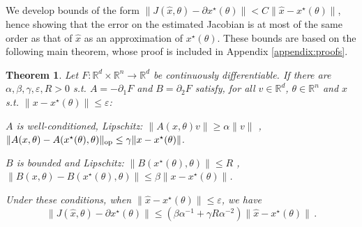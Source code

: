 \documentclass{article}
\makeatletter
\def\RR{{\mathbb R}}
\newtheorem{theorem}{Theorem}
\newcommand{\qberthet}[1]{\textcolor{red}{\texttt{qberthet@:} #1}}
\makeatother
\begin{document}
We develop bounds of the form $\|J(\hat{x}, \theta) - \partial x^\star(\theta)\|
< C \|\hat x - x^\star(\theta)\|$, hence showing that the error on the estimated
Jacobian is at most of the same order as that of $\hat x$ as an approximation of
$x^{\star}(\theta)$. These bounds are based on the following main theorem, whose
proof is included in Appendix \ref{appendix:proofs}.
\begin{theorem}\label{thm:jacob}
Let $F:\RR^d \times \RR^n \to \RR^d$ be continuously differentiable. If there are
$\alpha, \beta, \gamma, \varepsilon, R>0$ s.t. $A = -\partial_1 F$ and $B =
\partial_2 F$ satisfy, for all $v\in\RR^d$, $\theta \in \RR^n$ and $x$ s.t. 
$\|x - x^\star(\theta)\| \le \varepsilon$:

$A$ is well-conditioned, Lipschitz: $\|A(x, \theta) v \| \ge \alpha \|v\|$ ,
$\|A(x, \theta) - A(x^\star(\theta), \theta)\|_{\textnormal{op}} \le \gamma \|x -
x^\star(\theta)\|$.

$B$ is bounded and Lipschitz: $\|B(x^\star(\theta), \theta)\| \le R$ , $\|B(x, \theta) - B(x^\star(\theta), \theta)\| \le \beta \|x - x^\star(\theta)\|$.

Under these conditions, when $\|\hat x - x^\star(\theta)\| \le \varepsilon$, we have
\[
\|J(\hat x, \theta) - \partial x^\star (\theta)\| \le \left(\beta\alpha^{-1} + \gamma R \alpha^{-2}\right) \|\hat x - x^\star(\theta)\|\, .
\]
\end{theorem}



\end{document}
